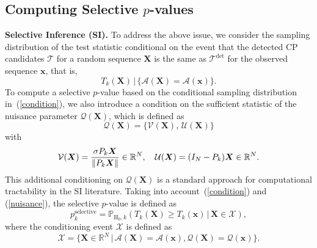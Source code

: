 \subsection{Computing Selective $p$-values}

\textbf{Selective Inference (SI).}
%
To address the above issue, we consider the sampling distribution of the test statistic conditional on the event that the detected CP candidates $\bm{\mathcal{T}}$ for a random sequence $\bm{X}$ is the same as $\bm{\mathcal{T}}^{\text{det}}$ for the observed sequence $\bm{x}$, that is, 
\begin{equation}
  T_k(\bm{X}) \, | \, \{\mathcal{A}(\bm{X}) = \mathcal{A}(\bm{x})\}. \label{condition}
\end{equation}
%
To compute a selective $p$-value based on the conditional sampling distribution in~(\ref{condition}), we also introduce a condition on the sufficient statistic of the nuisance parameter $\mathcal{Q}(\bm{X})$, which is defined as %
\begin{equation}
  \mathcal{Q}(\bm{X}) = \{\mathcal{V}(\bm{X}), \, \mathcal{U}(\bm{X})\} \label{nuisance}
\end{equation} 
with
\begin{equation}
  \mathcal{V}(\bm{X}) = \frac{\sigma P_k \bm{X}}{\| P_k \bm{X} \|} \in \mathbb{R}^N, ~~~ \mathcal{U}(\bm{X}) = (I_{N} - P_k) \bm{X} \in \mathbb{R}^N. \notag
\end{equation}
%
This additional conditioning on $\mathcal{Q}(\bm{X})$ is a standard approach for computational tractability in the SI literature.
%
Taking into account~(\ref{condition}) and (\ref{nuisance}), the selective $p$-value is defined as
\begin{equation}
  p_k^{\text{selective}} = \mathbb{P}_{\text{H}_0,k} (T_k(\bm{X}) \geq T_k(\bm{x}) \, | \, \bm{X} \in \mathcal{X}), \label{p_selective}
\end{equation}
where the conditioning event $\mathcal{X}$ is defined as
\begin{equation}
  \mathcal{X} = \{\bm{X} \in \mathbb{R}^N \, | \, \mathcal{A}(\bm{X}) = \mathcal{A}(\bm{x}), \mathcal{Q}(\bm{X}) =\mathcal{Q}(\bm{x})\}. \label{data_space}
\end{equation}
